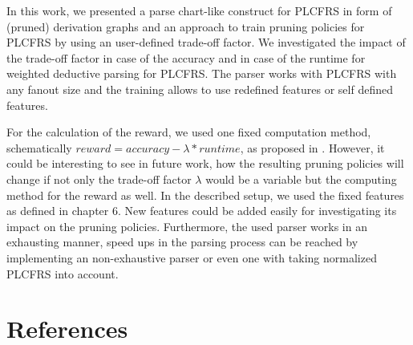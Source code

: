 \documentclass{tudscrartcl}
\theoremstyle{definition}
\begin{document}
In this work, we presented a parse chart-like construct for PLCFRS in form of (pruned) derivation graphs and an approach to train pruning policies for PLCFRS by using an user-defined trade-off factor. We investigated the impact of the trade-off factor in case of the accuracy and in case of the runtime for weighted deductive parsing for PLCFRS. The parser works with PLCFRS with any fanout size and the training allows to use redefined features or self defined features.

For the calculation of the reward, we used one fixed computation method, schematically $reward = accuracy - \lambda * runtime$, as proposed in \cite{vieira17}.
However, it could be interesting to see in future work, how the resulting pruning policies will change if not only the trade-off factor $\lambda$ would be a variable but the computing method for the reward as well.
In the described setup, we used the fixed features as defined in chapter 6. New features could be added easily for investigating its impact on the pruning policies.
Furthermore, the used parser works in an exhausting manner, speed ups in the parsing process can be reached by implementing an non-exhaustive parser or even one with taking normalized PLCFRS into account.


\section{References}
\nocite{*}
\printbibliography[heading=none]
\end{document}
